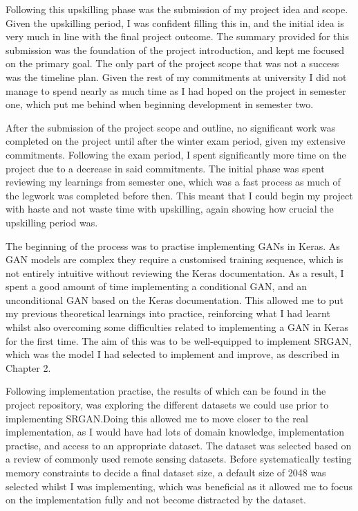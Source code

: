 \begin{appendices}
Following this upskilling phase was the submission of my project idea and scope. Given the upskilling period, I was confident filling this in, and the initial idea is very much in line with the final project outcome. The summary provided for this submission was the foundation of the project introduction, and kept me focused on the primary goal. The only part of the project scope that was not a success was the timeline plan. Given the rest of my commitments at university I did not manage to spend nearly as much time as I had hoped on the project in semester one, which put me behind when beginning development in semester two.

After the submission of the project scope and outline, no significant work was completed on the project until after the winter exam period, given my extensive commitments. Following the exam period, I spent significantly more time on the project due to a decrease in said commitments. The initial phase was spent reviewing my learnings from semester one, which was a fast process as much of the legwork was completed before then. This meant that I could begin my project with haste and not waste time with upskilling, again showing how crucial the upskilling period was.

The beginning of the process was to practise implementing GANs in Keras. As GAN models are complex they require a customised training sequence, which is not entirely intuitive without reviewing the Keras documentation. As a result, I spent a good amount of time implementing a conditional GAN, and an unconditional GAN based on the Keras documentation. This allowed me to put my previous theoretical learnings into practice, reinforcing what I had learnt whilst also overcoming some difficulties related to implementing a GAN in Keras for the first time. The aim of this was to be  well-equipped to implement SRGAN, which was the model I had selected to implement and improve, as described in Chapter 2.

Following implementation practise, the results of which can be found in the project repository, was exploring the different datasets we could use prior to implementing SRGAN.\@ Doing this allowed me to move closer to the real implementation, as I would have had lots of domain knowledge, implementation practise, and access to an appropriate dataset. The dataset was selected based on a review of commonly used remote sensing datasets. Before systematically testing memory constraints to decide a final dataset size, a default size of 2048 was selected whilst I was implementing, which was beneficial as it allowed me to focus on the implementation fully and not become distracted by the dataset.


\end{appendices}
